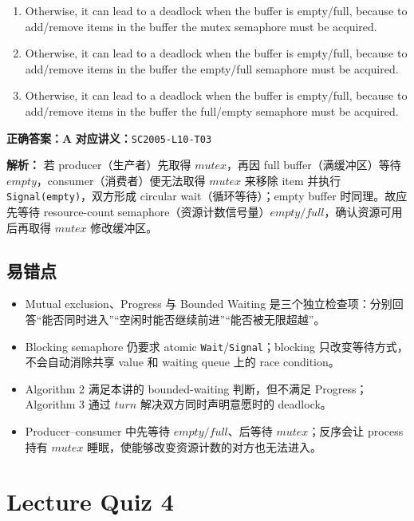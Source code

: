 \documentclass[11pt,a4paper,fontset=fandol]{ctexart}
\renewenvironment{checkedsolution}
  {\par\nopagebreak[4]\textbf{解析：}\ignorespaces}
  {\par}
\begin{document}
\begin{enumerate}[label=\Alph*.,leftmargin=2.4em]
  \item Otherwise, it can lead to a deadlock when the buffer is empty/full, because to add/remove items in the buffer the mutex semaphore must be acquired.
  \item Otherwise, it can lead to a deadlock when the buffer is empty/full, because to add/remove items in the buffer the empty/full semaphore must be acquired.
  \item Otherwise, it can lead to a deadlock when the buffer is empty/full, because to add/remove items in the buffer the full/empty semaphore must be acquired.
\end{enumerate}

\textbf{正确答案：A}\qquad
\textbf{对应讲义：}\texttt{SC2005-L10-T03}

\begin{checkedsolution}
若 producer（生产者）先取得 $mutex$，再因 full buffer（满缓冲区）等待 $empty$，consumer（消费者）便无法取得 $mutex$ 来移除 item 并执行 \texttt{Signal(empty)}，双方形成 circular wait（循环等待）；empty buffer 时同理。故应先等待 resource-count semaphore（资源计数信号量）$empty/full$，确认资源可用后再取得 $mutex$ 修改缓冲区。
\end{checkedsolution}

\subsection{易错点}

\begin{itemize}
  \item Mutual exclusion、Progress 与 Bounded Waiting 是三个独立检查项：分别回答“能否同时进入”“空闲时能否继续前进”“能否被无限超越”。
  \item Blocking semaphore 仍要求 atomic \texttt{Wait}/\texttt{Signal}；blocking 只改变等待方式，不会自动消除共享 value 和 waiting queue 上的 race condition。
  \item Algorithm 2 满足本讲的 bounded-waiting 判断，但不满足 Progress；Algorithm 3 通过 $turn$ 解决双方同时声明意愿时的 deadlock。
  \item Producer--consumer 中先等待 $empty/full$、后等待 $mutex$；反序会让 process 持有 $mutex$ 睡眠，使能够改变资源计数的对方也无法进入。
\end{itemize}

\section{Lecture Quiz 4}
\label{homework:SC2005-HW04}
\end{document}
